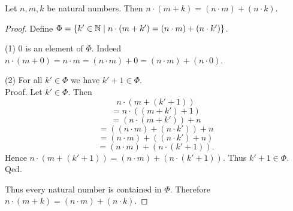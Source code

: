 \documentclass[10pt]{article}
\begin{document}
  \begin{forthel}
    \begin{proposition}
      Let $n, m, k$ be natural numbers.
      Then $n \cdot (m + k) = (n \cdot m) + (n \cdot k)$.
    \end{proposition}
    \begin{proof}
      Define $\Phi = \{ k' \in \mathbb{N} \mid n \cdot (m + k') = (n \cdot m) + (n \cdot k') \}$.

      (1) $0$ is an element of $\Phi$.
      Indeed $n \cdot (m + 0)
        = n \cdot m
        = (n \cdot m) + 0
        = (n \cdot m) + (n \cdot 0)$.

      (2) For all $k' \in \Phi$ we have $k' + 1 \in \Phi$. \\
      Proof.
        Let $k'\in \Phi$.
        Then
        \[  n \cdot (m + (k' + 1))                  \]
        \[    = n \cdot ((m + k') + 1)              \]
        \[    = (n \cdot (m + k')) + n              \]
        \[    = ((n \cdot m) + (n \cdot k')) + n    \]
        \[    = (n \cdot m) + ((n \cdot k') + n)    \]
        \[    = (n \cdot m) + (n \cdot (k' + 1)).   \]
        Hence $n \cdot (m + (k' + 1)) = (n \cdot m) + (n \cdot (k' + 1))$.
        Thus $k' + 1 \in \Phi$.
      Qed.

      Thus every natural number is contained in $\Phi$.
      Therefore $n \cdot (m + k) = (n \cdot m) + (n \cdot k)$.
    \end{proof}
  \end{forthel}
\end{document}
